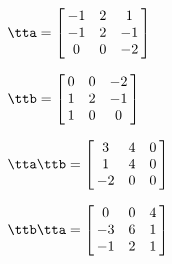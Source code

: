 {$\tta = \left[\hskip -3pt \begin{array}{ccc} -1&2&1\\  -1&2&-1
\\  0&0&-2\end{array}\hskip -3pt \right] $ 

$\ttb =  \left[\hskip -3pt \begin{array}{ccc} 0&0&-2\\  1&2&-1
\\  1&0&0\end{array}\hskip -3pt \right] 
    $}
{$\tta\ttb = \left[\hskip -3pt \begin{array}{ccc} 3&4&0\\  1&4&0
\\  -2&0&0\end{array}\hskip -3pt \right]  $

$\ttb\tta = \left[\hskip -3pt \begin{array}{ccc} 0&0&4\\  -3&6&1
\\  -1&2&1\end{array}\hskip -3pt \right]$ }
 